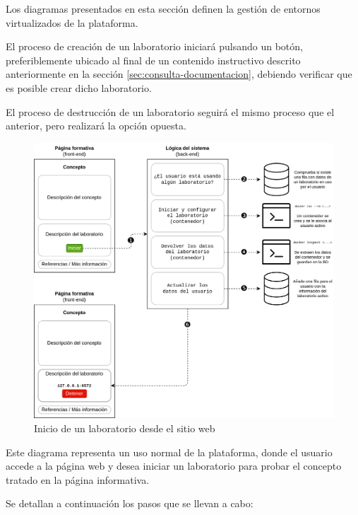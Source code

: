             Los diagramas presentados en esta sección definen la gestión de entornos virtualizados de la plataforma.
            
            El proceso de creación de un laboratorio iniciará pulsando un botón, preferiblemente ubicado al final de un contenido instructivo descrito anteriormente en la sección \ref{sec:consulta-documentacion}, debiendo verificar que es posible crear dicho laboratorio.
            
            El proceso de destrucción de un laboratorio seguirá el mismo proceso que el anterior, pero realizará la opción opuesta.

            \newpage

            \begin{figure}[h]
                \centering

                \includegraphics[scale=0.125]{images/Diagramas/iniciar.png}

                \caption{Inicio de un laboratorio desde el sitio web}
                    \label{fig:inicio-laboratorio}
            \end{figure}

            Este diagrama representa un uso normal de la plataforma, donde el usuario accede a la página web y desea iniciar un laboratorio para probar el concepto tratado en la página informativa.

            Se detallan a continuación los pasos que se llevan a cabo:

